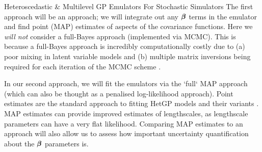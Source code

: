 \begin{chapter}{Heteroscedastic \& Multilevel GP Emulators For Stochastic Simulators\label{Ch:Hetsml}}
The first approach will be an  approach; we will integrate out any $\bm{\beta}$ terms in the emulator and find point (MAP) estimates of aspects of the covariance functions. Here we \textit{will not} consider a full-Bayes approach (implemented via MCMC). This is because a full-Bayes approach is incredibly computationally costly due to (a) poor mixing in latent variable models and (b) multiple matrix inversions being required for each iteration of the MCMC scheme \citep{Kersting2007}.

In our second approach, we will fit the emulators via the `full` MAP approach (which can also be thought as a penalised log-likelihood approach). Point estimates are the standard approach to fitting HetGP models and their variants \citep{Binois2019}. MAP estimates can provide improved estimates of lengthscales, as lengthscale parameters can have a very flat likelihood. Comparing MAP estimates to an  approach will also allow us to assess how important uncertainty quantification about the $\bm{\beta}$ parameters is.

\end{chapter}
